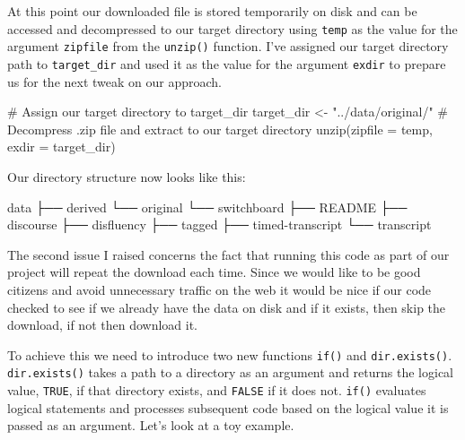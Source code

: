 \documentclass[
  letterpaper,
]{latex/krantz}
\newenvironment{Shaded}{\begin{snugshade}}{\end{snugshade}}
\newcommand{\AttributeTok}[1]{\textcolor[rgb]{0.40,0.45,0.13}{#1}}
\newcommand{\CommentTok}[1]{\textcolor[rgb]{0.37,0.37,0.37}{#1}}
\newcommand{\ExtensionTok}[1]{\textcolor[rgb]{0.00,0.23,0.31}{#1}}
\newcommand{\FunctionTok}[1]{\textcolor[rgb]{0.28,0.35,0.67}{#1}}
\newcommand{\NormalTok}[1]{\textcolor[rgb]{0.00,0.23,0.31}{#1}}
\newcommand{\OtherTok}[1]{\textcolor[rgb]{0.00,0.23,0.31}{#1}}
\newcommand{\StringTok}[1]{\textcolor[rgb]{0.13,0.47,0.30}{#1}}
\begin{document}
At this point our downloaded file is stored temporarily on disk and can
be accessed and decompressed to our target directory using \texttt{temp}
as the value for the argument \texttt{zipfile} from the \texttt{unzip()}
function. I've assigned our target directory path to
\texttt{target\_dir} and used it as the value for the argument
\texttt{exdir} to prepare us for the next tweak on our approach.

\begin{Shaded}
\begin{Highlighting}[]
\CommentTok{\# Assign our target directory to \textasciigrave{}target\_dir\textasciigrave{}}
\NormalTok{target\_dir }\OtherTok{\textless{}{-}} \StringTok{"../data/original/"}
\CommentTok{\# Decompress .zip file and extract to our target directory}
\FunctionTok{unzip}\NormalTok{(}\AttributeTok{zipfile =}\NormalTok{ temp, }\AttributeTok{exdir =}\NormalTok{ target\_dir)}
\end{Highlighting}
\end{Shaded}

Our directory structure now looks like this:

\begin{Shaded}
\begin{Highlighting}[]
\ExtensionTok{data}
\ExtensionTok{├──}\NormalTok{ derived}
\ExtensionTok{└──}\NormalTok{ original}
    \ExtensionTok{└──}\NormalTok{ switchboard}
        \ExtensionTok{├──}\NormalTok{ README}
        \ExtensionTok{├──}\NormalTok{ discourse}
        \ExtensionTok{├──}\NormalTok{ disfluency}
        \ExtensionTok{├──}\NormalTok{ tagged}
        \ExtensionTok{├──}\NormalTok{ timed{-}transcript}
        \ExtensionTok{└──}\NormalTok{ transcript}
\end{Highlighting}
\end{Shaded}

The second issue I raised concerns the fact that running this code as
part of our project will repeat the download each time. Since we would
like to be good citizens and avoid unnecessary traffic on the web it
would be nice if our code checked to see if we already have the data on
disk and if it exists, then skip the download, if not then download it.

To achieve this we need to introduce two new functions \texttt{if()} and
\texttt{dir.exists()}. \texttt{dir.exists()} takes a path to a directory
as an argument and returns the logical value, \texttt{TRUE}, if that
directory exists, and \texttt{FALSE} if it does not. \texttt{if()}
evaluates logical statements and processes subsequent code based on the
logical value it is passed as an argument. Let's look at a toy example.
\end{document}
